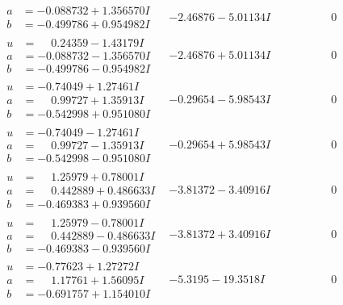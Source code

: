 \documentclass[1p]{elsarticle_modified}
\theoremstyle{definition}
\begin{document}
$$\begin{array}{c|c|c}
\begin{aligned}
a &= -0.088732 + 1.356570 I \\
b &= -0.499786 + 0.954982 I\end{aligned}
 & -2.46876 - 5.01134 I & \phantom{-0.000000 } 0 \\ \hline\begin{aligned}
u &= \phantom{-}0.24359 - 1.43179 I \\
a &= -0.088732 - 1.356570 I \\
b &= -0.499786 - 0.954982 I\end{aligned}
 & -2.46876 + 5.01134 I & \phantom{-0.000000 } 0 \\ \hline\begin{aligned}
u &= -0.74049 + 1.27461 I \\
a &= \phantom{-}0.99727 + 1.35913 I \\
b &= -0.542998 + 0.951080 I\end{aligned}
 & -0.29654 - 5.98543 I & \phantom{-0.000000 } 0 \\ \hline\begin{aligned}
u &= -0.74049 - 1.27461 I \\
a &= \phantom{-}0.99727 - 1.35913 I \\
b &= -0.542998 - 0.951080 I\end{aligned}
 & -0.29654 + 5.98543 I & \phantom{-0.000000 } 0 \\ \hline\begin{aligned}
u &= \phantom{-}1.25979 + 0.78001 I \\
a &= \phantom{-}0.442889 + 0.486633 I \\
b &= -0.469383 + 0.939560 I\end{aligned}
 & -3.81372 - 3.40916 I & \phantom{-0.000000 } 0 \\ \hline\begin{aligned}
u &= \phantom{-}1.25979 - 0.78001 I \\
a &= \phantom{-}0.442889 - 0.486633 I \\
b &= -0.469383 - 0.939560 I\end{aligned}
 & -3.81372 + 3.40916 I & \phantom{-0.000000 } 0 \\ \hline\begin{aligned}
u &= -0.77623 + 1.27272 I \\
a &= \phantom{-}1.17761 + 1.56095 I \\
b &= -0.691757 + 1.154010 I\end{aligned}
 & -5.3195 - 19.3518 I & \phantom{-0.000000 } 0 \\ \hline\begin{aligned}

\end{aligned}
\end{array}$$
\end{document}
